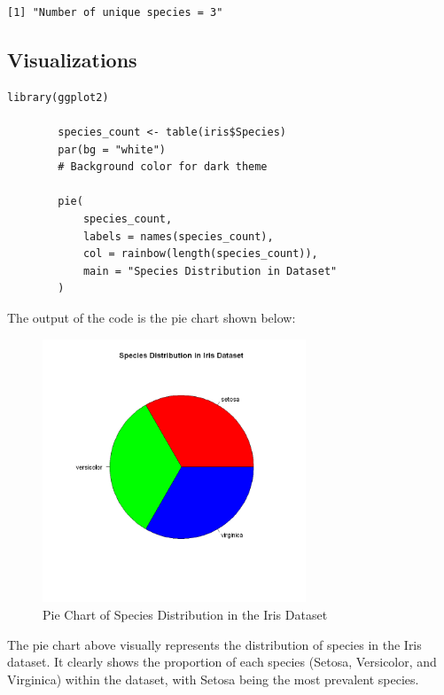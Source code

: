 \documentclass[a4paper,12pt]{article}
\begin{document}
\begin{verbatim}
[1] "Number of unique species = 3"
\end{verbatim}

\newpage
\subsection{Visualizations}

    \begin{lstlisting}[style=RStyle]
        library(ggplot2)
        
        species_count <- table(iris$Species)
        par(bg = "white")                          
        # Background color for dark theme

        pie(
            species_count,
            labels = names(species_count),
            col = rainbow(length(species_count)),
            main = "Species Distribution in Dataset"
        )
    \end{lstlisting}
        
    The output of the code is the pie chart shown below:

    \begin{figure}[h]
        \includegraphics[width=0.7\textwidth]{Images/01.png}
        \caption{Pie Chart of Species Distribution in the Iris Dataset}
        \label{fig:pie_chart}
    \end{figure}
    The pie chart above visually represents the distribution of species in the Iris dataset. It clearly shows the proportion of each species (Setosa, Versicolor, and Virginica) within the dataset, with Setosa being the most prevalent species.
    \newpage
\end{document}
